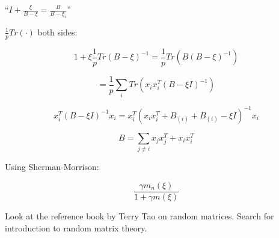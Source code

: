 \documentclass[12pt]{article}
\theoremstyle{plain}
\begin{document}
``$I + \frac{\xi}{B-\xi} = \frac{B}{B-\xi_i}$''

$\frac{1}{p} Tr(\cdot)$ both sides:

$$ 1 + \xi \frac{1}{p} Tr(B - \xi)^{-1} = \frac{1}{p} Tr(B (B- \xi)^{-1}) $$

$$ = \frac{1}{p} \sum_i Tr(x_i x_i^T (B- \xi I)^{-1}) $$

$$ x_i^T(B - \xi I)^{-1} x_i = x_i^T(x_ix_i^T + B_{(i)} + B_{(i)} - \xi I)^{-1} x_i $$

$$ B = \sum_{j \neq i} x_j x_j^T + x_i x_i^T $$

Using Sherman-Morrison:

$$ \frac{\gamma m_n(\xi)}{1+\gamma m(\xi)} $$

Look at the reference book by Terry Tao on random matrices. Search for introduction to random matrix theory.
\end{document}
